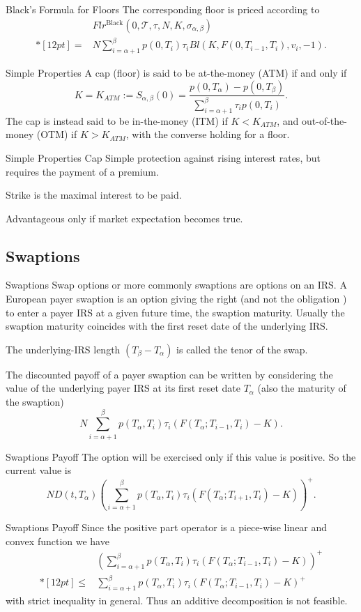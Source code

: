 Black's Formula for Floors
The corresponding floor is priced according to
	$$\begin{array}{ll}
	&\displaystyle
	Flr^{\mbox{Black}}(0,{\mathcal T},\tau,N,K,\sigma_{\alpha,\beta})\\*[12pt]
	=&\displaystyle
	N\sum_{i=\alpha+1}^{\beta}p(0,T_i)\tau_i Bl(K,F(0,T_{i-1},T_i),v_i,-1).
	\end{array}
	$$

Simple Properties
	A cap (floor) is said to be at-the-money (ATM) if and only if
		$$
		K=K_{ATM}:=S_{\alpha,\beta}(0)=\frac{p(0,T_{\alpha})-p(0,T_{\beta})}{\sum_{i=\alpha+1}^{\beta}\tau_ip(0,T_i)}.
		$$
	The cap is instead said to be in-the-money (ITM) if $K<K_{ATM}$,
	and out-of-the-money (OTM) if $K>K_{ATM}$, with the converse
	holding for a floor.


Simple Properties Cap
	Simple protection against rising interest rates, but requires the payment of a premium.
	
	Strike is the maximal interest to be paid.
	
	Advantageous only if market expectation becomes true.


\subsection{Swaptions}

Swaptions
	Swap options or more commonly swaptions are options on an IRS. A
	European payer swaption is an option giving the right (and not the
	obligation ) to enter a payer IRS at a given future time, the
	swaption maturity. Usually the swaption maturity coincides with
	the first reset date of the underlying IRS.

	The underlying-IRS
	length $(T_{\beta}-T_{\alpha})$ is called the tenor of the swap.

	The discounted payoff of a payer swaption can be written by
	considering the value of the underlying payer IRS at its first
	reset date $T_{\alpha}$ (also the maturity of the swaption)
		$$
		N\sum_{i=\alpha+1}^{\beta} p(T_{\alpha},T_i)\tau_i(F(T_{\alpha};T_{i-1},T_i)-K).
		$$


Swaptions Payoff
The option will be exercised only if this
value is positive. So the current value is
	$$
	ND(t,T_{\alpha})\left(\sum_{i=\alpha+1}^{\beta}p(T_{\alpha},T_i)\tau_i
	(F(T_{\alpha};T_{i+1},T_i)-K)\right)^+.
	$$


Swaptions Payoff
	Since the positive part operator is a
	piece-wise linear and convex function we have
		$$\begin{array}{ll}
		&\displaystyle
		\left(\sum_{i=\alpha+1}^{\beta}p(T_{\alpha},T_i)\tau_i(F(T_{\alpha};T_{i-1},T_i)-K)\right)^+\\*[12pt]
		\leq&\displaystyle \sum_{i=\alpha+1}^{\beta}p(T_{\alpha},T_i)\tau_i(F(T_{\alpha};T_{i-1},T_i)-K)^+
		\end{array}
		$$
	with strict inequality in general. Thus an additive decomposition is not
	feasible.
	

